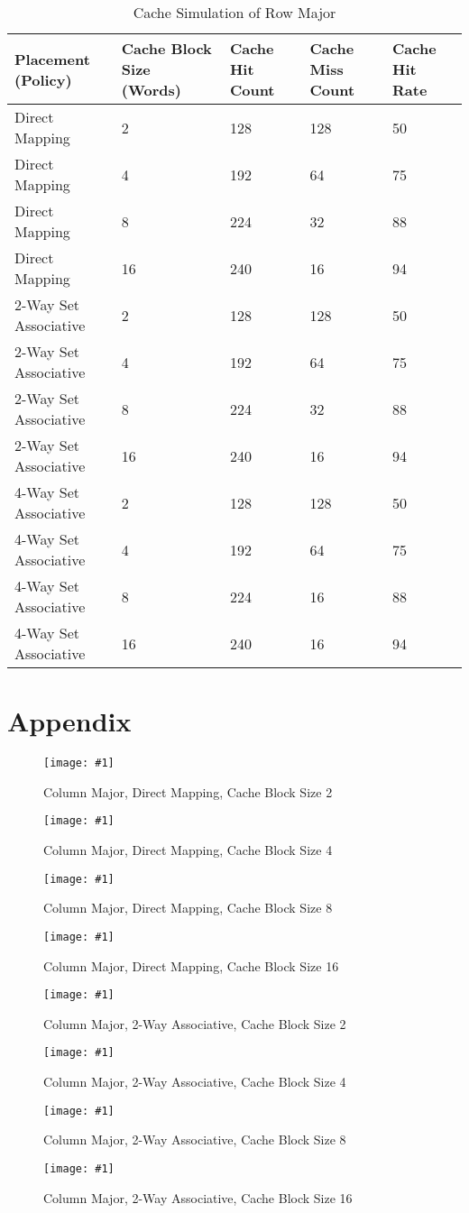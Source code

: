 \documentclass[11pt,a4paper]{article}
\newcommand{\cacheResultFigure}[3]{
\begin{figure}
	\centering
	\texttt{[image: \#1]}
	\caption{#2}
	\label{#3}
\end{figure}
}
\begin{document}
\begin{table}
\caption{Cache Simulation of Row Major}
\label{tab:tableRowMajor}
\begin{tabular}{lllll}
\hline %
Placement (Policy) & Cache Block Size (Words) & Cache Hit Count & Cache Miss Count & Cache Hit Rate \\
\hline %
Direct Mapping & 2 & 128 & 128 & 50  \\
Direct Mapping & 4 & 192 & 64 & 75  \\
Direct Mapping & 8 & 224 & 32 & 88  \\
Direct Mapping & 16 & 240 & 16 & 94  \\
2-Way Set Associative & 2 & 128 & 128 & 50 \\
2-Way Set Associative & 4 & 192 & 64 & 75 \\
2-Way Set Associative & 8 & 224 & 32 & 88 \\
2-Way Set Associative & 16 & 240 & 16 & 94 \\
4-Way Set Associative & 2 & 128 & 128 & 50 \\
4-Way Set Associative & 4 & 192 & 64 & 75 \\
4-Way Set Associative & 8 & 224 & 16 & 88 \\
4-Way Set Associative & 16 & 240 & 16 & 94 \\
\hline %
\end{tabular} 
\end{table}




\newpage
\section{Appendix}
\cacheResultFigure{pictures/task4_columnMajor_directMapping2}{Column Major, Direct Mapping, Cache Block Size 2}{fig:pic}
\cacheResultFigure{pictures/task4_columnMajor_directMapping4}{Column Major, Direct Mapping, Cache Block Size 4}{fig:pic}
\cacheResultFigure{pictures/task4_columnMajor_directMapping8}{Column Major, Direct Mapping, Cache Block Size 8}{fig:pic}
\cacheResultFigure{pictures/task4_columnMajor_directMapping16}{Column Major, Direct Mapping, Cache Block Size 16}{fig:pic}

\cacheResultFigure{pictures/task4_columnMajor_2waySetAssociative2}{Column Major, 2-Way Associative, Cache Block Size 2}{fig:pic}
\cacheResultFigure{pictures/task4_columnMajor_2waySetAssociative4}{Column Major, 2-Way Associative, Cache Block Size 4}{fig:pic}
\cacheResultFigure{pictures/task4_columnMajor_2waySetAssociative8}{Column Major, 2-Way Associative, Cache Block Size 8}{fig:pic}
\cacheResultFigure{pictures/task4_columnMajor_2waySetAssociative16}{Column Major, 2-Way Associative, Cache Block Size 16}{fig:pic}
\end{document}
